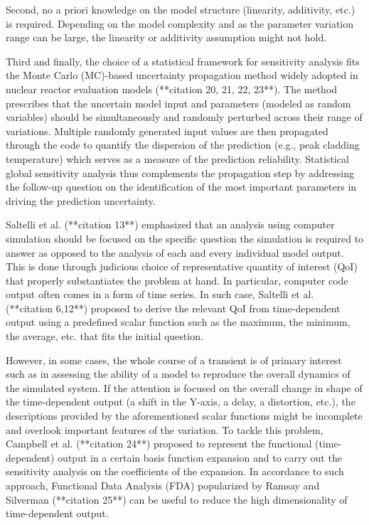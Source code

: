 Second, no a priori knowledge on the model structure (linearity, additivity, etc.) is required. 
Depending on the model complexity and as the parameter variation range can be large, 
the linearity or additivity assumption might not hold.

Third and finally, 
the choice of a statistical framework for sensitivity analysis fits the Monte Carlo (MC)-based uncertainty propagation method widely adopted in nuclear reactor evaluation models (**citation 20, 21, 22, 23**). 
The method prescribes that the uncertain model input and parameters (modeled as random variables) 
should be simultaneously and randomly perturbed across their range of variations. 
Multiple randomly generated input values are then propagated through the code to quantify the dispersion of the prediction (e.g., peak cladding temperature) 
which serves as a measure of the prediction reliability. 
Statistical global sensitivity analysis thus complements the propagation step 
by addressing the follow-up question on the identification of the most important parameters in driving the prediction uncertainty. 

Saltelli et al. (**citation 13**) emphasized that an analysis using computer simulation 
should be focused on the specific question the simulation is required to answer 
as opposed to the analysis of each and every individual model output. 
This is done through judicious choice of representative quantity of interest (QoI) 
that properly substantiates the problem at hand. 
In particular, computer code output often comes in a form of time series. 
In such case, Saltelli et al. (**citation 6,12**) proposed to derive the relevant QoI from time-dependent output 
using a predefined scalar function such as the maximum, the minimum, the average, etc. that fits the initial question.

However, in some cases, the whole course of a transient is of primary interest 
such as in assessing the ability of a model to reproduce the overall dynamics of the simulated system. 
If the attention is focused on the overall change in shape of the time-dependent output (a shift in the Y-axis, a delay, a distortion, etc.), 
the descriptions provided by the aforementioned scalar functions might be incomplete and overlook important features of the variation. 
To tackle this problem, Campbell et al. (**citation 24**) proposed to represent the functional (time-dependent) output in a certain basis function expansion 
and to carry out the sensitivity analysis on the coefficients of the expansion. 
In accordance to such approach, Functional Data Analysis (FDA) popularized by Ramsay and Silverman (**citation 25**) 
can be useful to reduce the high dimensionality of time-dependent output.

